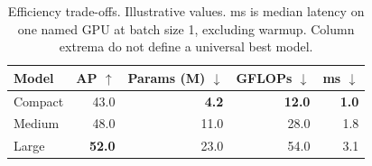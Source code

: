 \begin{table}[!htbp]
\centering\small
\setlength{\tabcolsep}{3pt}
\begin{tabular}{lrrrr}
\toprule
Model & AP $\uparrow$ & Params (M) $\downarrow$ & GFLOPs $\downarrow$ & ms $\downarrow$ \\
\midrule
Compact & 43.0 & \textbf{4.2} & \textbf{12.0} & \textbf{1.0} \\
Medium & 48.0 & 11.0 & 28.0 & 1.8 \\
Large & \textbf{52.0} & 23.0 & 54.0 & 3.1 \\
\bottomrule
\end{tabular}
\caption{Efficiency trade-offs. Illustrative values. ms is median latency on one named GPU at batch size 1, excluding warmup. Column extrema do not define a universal best model.}
\label{tab:efficiency}
\end{table}
